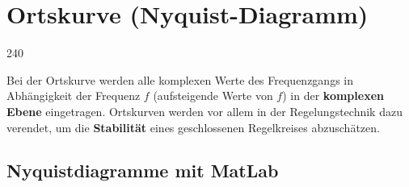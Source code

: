 \section{Ortskurve (Nyquist-Diagramm)}{240}

Bei der Ortskurve werden alle komplexen Werte des Frequenzgangs in Abhängigkeit der Frequenz $f$ (aufsteigende Werte von $f$) 
in der \textbf{komplexen Ebene} eingetragen. Ortskurven werden vor allem in der Regelungstechnik dazu verendet, um die 
\textbf{Stabilität} eines geschlossenen Regelkreises abzuschätzen. \\


\subsection{Nyquistdiagramme mit MatLab}


